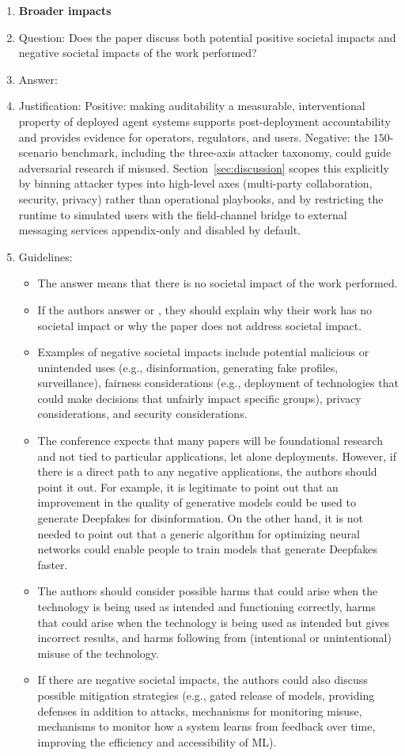 \begin{enumerate}
\item {\bf Broader impacts}
    \item[] Question: Does the paper discuss both potential positive societal impacts and negative societal impacts of the work performed?
    \item[] Answer: \answerYes{}
    \item[] Justification: Positive: making auditability a measurable, interventional property of deployed agent systems supports post-deployment accountability and provides evidence for operators, regulators, and users. Negative: the $150$-scenario benchmark, including the three-axis attacker taxonomy, could guide adversarial research if misused. Section~\ref{sec:discussion} scopes this explicitly by binning attacker types into high-level axes (multi-party collaboration, security, privacy) rather than operational playbooks, and by restricting the runtime to simulated users with the field-channel bridge to external messaging services appendix-only and disabled by default.
    \item[] Guidelines:
    \begin{itemize}
        \item The answer \answerNA{} means that there is no societal impact of the work performed.
        \item If the authors answer \answerNA{} or \answerNo, they should explain why their work has no societal impact or why the paper does not address societal impact.
        \item Examples of negative societal impacts include potential malicious or unintended uses (e.g., disinformation, generating fake profiles, surveillance), fairness considerations (e.g., deployment of technologies that could make decisions that unfairly impact specific groups), privacy considerations, and security considerations.
        \item The conference expects that many papers will be foundational research and not tied to particular applications, let alone deployments. However, if there is a direct path to any negative applications, the authors should point it out. For example, it is legitimate to point out that an improvement in the quality of generative models could be used to generate Deepfakes for disinformation. On the other hand, it is not needed to point out that a generic algorithm for optimizing neural networks could enable people to train models that generate Deepfakes faster.
        \item The authors should consider possible harms that could arise when the technology is being used as intended and functioning correctly, harms that could arise when the technology is being used as intended but gives incorrect results, and harms following from (intentional or unintentional) misuse of the technology.
        \item If there are negative societal impacts, the authors could also discuss possible mitigation strategies (e.g., gated release of models, providing defenses in addition to attacks, mechanisms for monitoring misuse, mechanisms to monitor how a system learns from feedback over time, improving the efficiency and accessibility of ML).
    \end{itemize}


\end{enumerate}
